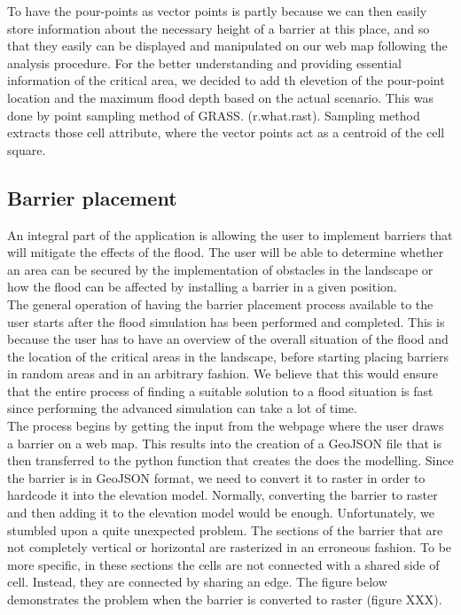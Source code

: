 To have the pour-points as vector points is partly because we can then easily store information about the necessary height of a barrier at this place, and so that they easily can be displayed and manipulated on our web map following the analysis procedure. 
For the better understanding and providing essential information of the critical area, we decided to add th elevetion of the pour-point location and the maximum flood depth based on the actual scenario. This was done by point sampling method of GRASS. (r.what.rast). Sampling method extracts those cell attribute, where the vector points act as a centroid of the cell square. \\

\subsection{Barrier placement}
An integral part of the application is allowing the user to implement barriers that will mitigate the effects of the flood. The user will be able to determine whether an area can be secured by the implementation of obstacles in the landscape or how the flood can be affected by installing a barrier in a given position. \\
The general operation of having the barrier placement process available to the user starts after the flood simulation has been performed and completed. This is because the user has to have an overview of the overall situation of the flood and the location of the critical areas in the landscape, before starting placing barriers in random areas and in an arbitrary fashion. We believe that this would ensure that the entire process of finding a suitable solution to a flood situation is fast since performing the advanced simulation can take a lot of time.\\

The process begins by getting the input from the webpage where the user draws a barrier on a web map. This results into the creation of a GeoJSON file that is then transferred to the python function that creates the does the modelling. Since the barrier is in GeoJSON format, we need to convert it to raster in order to hardcode it into the elevation model. Normally, converting the barrier to raster and then adding it to the elevation model would be enough. Unfortunately, we stumbled upon a quite unexpected problem. The sections of the barrier that are not completely vertical or horizontal are rasterized in an erroneous fashion. To be more specific, in these sections the cells are not connected with a shared side of cell. Instead, they are connected by sharing an edge. The figure below demonstrates the problem when the barrier is converted to raster (figure XXX).\\

